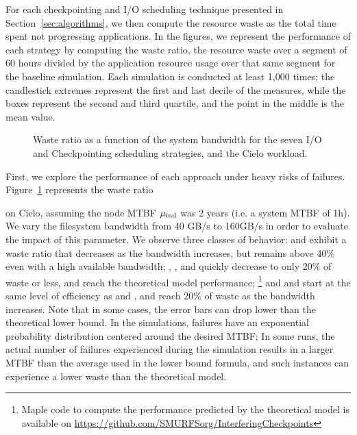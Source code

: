 For each checkpointing and I/O scheduling technique presented in
Section~\ref{sec:algorithms}, we then compute the resource waste as
the total time spent not progressing applications. In the figures, we
represent the performance of each strategy by computing the waste
ratio, \ie the resource waste over a segment of 60 hours divided by
the application resource usage over that same segment for the baseline
simulation. Each simulation is conducted at least 1,000 times; the
candlestick extremes represent the first and last decile of the
measures, while the boxes represent the second and third quartile, and
the point in the middle is the mean value.

\begin{figure}
  \begin{center}
    \resizebox{\linewidth}{!}{}
  \end{center}
  \caption{Waste ratio as a function of the system bandwidth for the
    seven I/O and Checkpointing scheduling strategies, and the Cielo
    workload. \label{fig:cielo-1hmtbf}}
\end{figure}

First, we explore the performance of each approach under heavy risks
of failures. Figure~\ref{fig:cielo-1hmtbf} represents the waste ratio

on Cielo, assuming the node MTBF $\mu_{\text{ind}}$ was 2 years (i.e. a system
MTBF of 1h). We vary the filesystem bandwidth from 40 GB/s to 160GB/s
in order to evaluate the impact of this parameter. We observe three
classes of behavior: \propfixed and \bfifofixed exhibit a waste ratio
that decreases as the bandwidth increases, but remains above 40\% even
with a high available bandwidth; \fifodaly, \fifofixed, and
\cooperative quickly decrease to only 20\% of waste or less, and reach
the theoretical model performance;
%
\footnote{Maple code to compute the
  performance predicted by the theoretical model is available on
  \url{https://github.com/SMURFSorg/InterferingCheckpoints}}
%
and \propdaly and \bfifodaly start at the same level of efficiency as
\propfixed and \bfifofixed, and reach 20\% of waste as the bandwidth
increases.
%
Note that in some cases, the error bars can drop lower than the theoretical
lower bound. In the simulations, failures have an exponential probability
distribution centered around the desired MTBF; In some runs, the actual
number of failures experienced during the simulation results in a larger
MTBF than the average used in the lower bound formula, and such instances
can experience a lower waste than the theoretical model.

